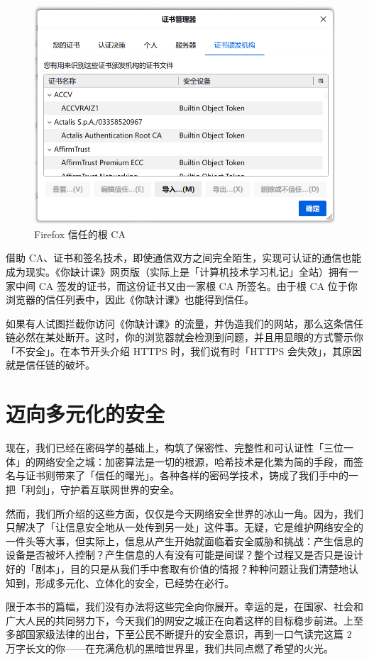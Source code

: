 \begin{figure}[htb!]
  \centering
  \includegraphics[width=.5\textwidth]{assets/surpass/Firefox_Root_CAs.png}
  \caption{Firefox 信任的根 CA}
  \label{fig:Firefox_Root_CAs}
\end{figure}

借助 CA、证书和签名技术，即使通信双方之间完全陌生，实现可认证的通信也能成为现实。《你缺计课》网页版（实际上是「计算机技术学习札记」全站）拥有一家中间 CA 签发的证书，而这份证书又由一家根 CA 所签名。由于根 CA 位于你浏览器的信任列表中，因此《你缺计课》也能得到信任。

如果有人试图拦截你访问《你缺计课》的流量，并伪造我们的网站，那么这条信任链必然在某处断开。这时，你的浏览器就会检测到问题，并且用显眼的方式警示你「不安全」。在本节开头介绍 HTTPS 时，我们说有时「HTTPS 会失效」，其原因就是信任链的破坏。

\section{迈向多元化的安全}

现在，我们已经在密码学的基础上，构筑了保密性、完整性和可认证性「三位一体」的网络安全之城：加密算法是一切的根源，哈希技术是化繁为简的手段，而签名与证书则带来了「信任的曙光」。各种各样的密码学技术，铸成了我们手中的一把「利剑」，守护着互联网世界的安全。

然而，我们所介绍的这些方面，仅仅是今天网络安全世界的冰山一角。因为，我们只解决了「让信息安全地从一处传到另一处」这件事。无疑，它是维护网络安全的一件头等大事，但实际上，信息从产生开始就面临着安全威胁和挑战：产生信息的设备是否被坏人控制？产生信息的人有没有可能是间谍？整个过程又是否只是设计好的「剧本」，目的只是从我们手中套取有价值的情报？种种问题让我们清楚地认知到，形成多元化、立体化的安全，已经势在必行。

限于本书的篇幅，我们没有办法将这些完全向你展开。幸运的是，在国家、社会和广大人民的共同努力下，今天我们的网安之城正在向着这样的目标稳步前进。上至多部国家级法律的出台，下至公民不断提升的安全意识，再到一口气读完这篇 2 万字长文的你——在充满危机的黑暗世界里，我们共同点燃了希望的火光。

